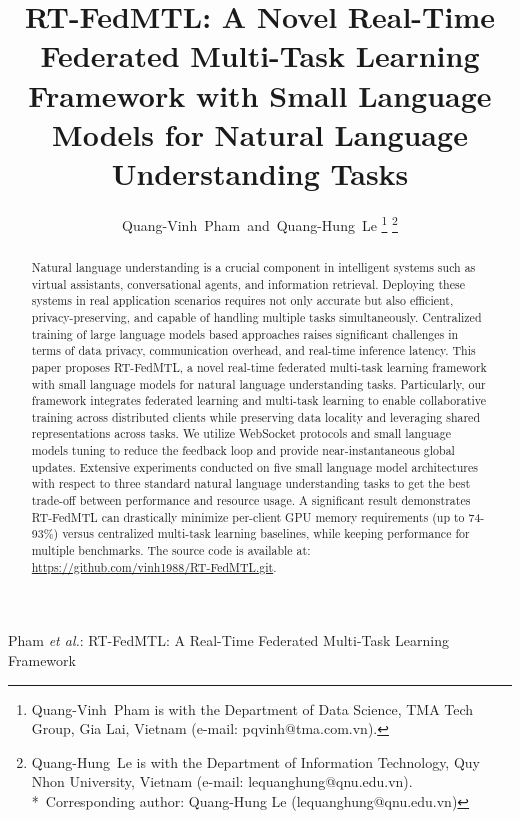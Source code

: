 \documentclass[journal]{IEEEtran}
\begin{document}
\title{RT-FedMTL: A Novel Real-Time Federated Multi-Task Learning Framework with Small Language Models for Natural Language Understanding Tasks}

\author{Quang-Vinh~Pham~and~Quang-Hung~Le
\thanks{Quang-Vinh~Pham is with the Department of Data Science, TMA Tech Group, Gia Lai, Vietnam (e-mail: pqvinh@tma.com.vn).}%
\thanks{Quang-Hung~Le is with the Department of Information Technology, Quy Nhon University, Vietnam (e-mail: lequanghung@qnu.edu.vn).\\
*~Corresponding author: Quang-Hung Le (lequanghung@qnu.edu.vn)}}

{Pham \MakeLowercase{\textit{et al.}}: RT-FedMTL: A Real-Time Federated Multi-Task Learning Framework}

\maketitle

\begin{abstract}

Natural language understanding is a crucial component in intelligent systems such as virtual assistants, conversational agents, and information retrieval. Deploying these systems in real application scenarios requires not only accurate but also efficient, privacy-preserving, and capable of handling multiple tasks simultaneously. Centralized training of large language models based approaches raises significant challenges in terms of data privacy, communication overhead, and real-time inference latency. This paper proposes RT-FedMTL, a novel real-time federated multi-task learning framework with small language models for natural language understanding tasks. Particularly, our framework integrates federated learning and multi-task learning to enable collaborative training across distributed clients while preserving data locality and leveraging shared representations across tasks. We utilize WebSocket protocols and small language models tuning to reduce the feedback loop and provide near-instantaneous global updates. Extensive experiments conducted on five small language model architectures with respect to three standard natural language understanding tasks to get the best trade-off between performance and resource usage. A significant result demonstrates RT-FedMTL can drastically minimize per-client GPU memory requirements (up to 74-93\%) versus centralized multi-task learning baselines, while keeping performance for multiple benchmarks. The source code is available at: \url{https://github.com/vinh1988/RT-FedMTL.git}.
\end{abstract}
\end{document}

